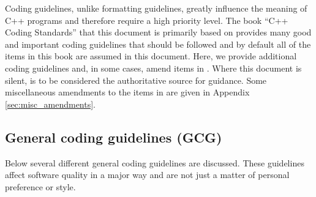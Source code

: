 Coding guidelines, unlike formatting guidelines, greatly influence the meaning
of C++ programs and therefore require a high priority level.  The book ``C++
Coding Standards'' {}\cite{C++CodingStandards05} that this document is
primarily based on provides many good and important coding guidelines that
should be followed and by default all of the items in this book are assumed in
this document.  Here, we provide additional coding guidelines and, in some
cases, amend items in {}\cite{C++CodingStandards05}.  Where this document is
silent, {}\cite{C++CodingStandards05} is to be considered the authoritative
source for guidance.  Some miscellaneous amendments to the items in
{}\cite{C++CodingStandards05} are given in Appendix
{}\ref{sec:misc_amendments}.

%
\subsection{General coding guidelines (GCG)}
%

Below several different general coding guidelines are discussed.  These
guidelines affect software quality in a major way and are not just a matter of
personal preference or style.

